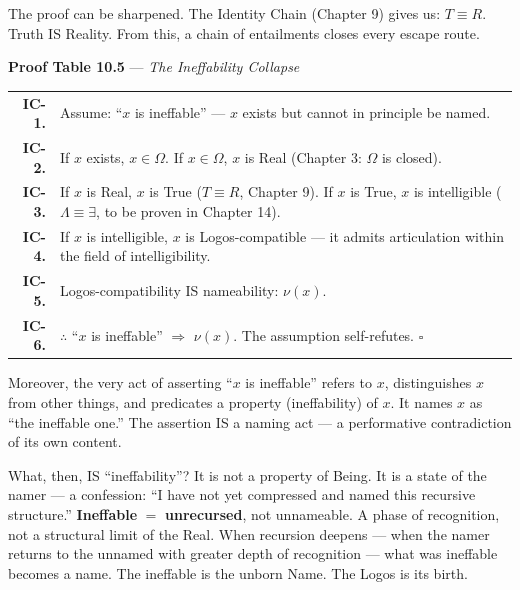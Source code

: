 \documentclass[10pt, openany, oneside]{book}
\renewcommand{\footnotesize}{\fontsize{8.5}{11}\selectfont}
\begin{document}
\vspace{1em}

\noindent The proof can be sharpened. The Identity Chain (Chapter 9) gives us: $T \equiv R$. Truth IS Reality. From this, a chain of entailments closes every escape route.

\textbf{Proof Table 10.5} --- \textit{The Ineffability Collapse}

\vspace{0.5em}

{\footnotesize
\noindent\begin{tabular}{r p{}}
\textbf{IC-1.} & Assume: ``$x$ is ineffable'' --- $x$ exists but cannot in principle be named. \\[0.3em]
\textbf{IC-2.} & If $x$ exists, $x \in \Omega$. If $x \in \Omega$, $x$ is Real (Chapter 3: $\Omega$ is closed). \\[0.3em]
\textbf{IC-3.} & If $x$ is Real, $x$ is True ($T \equiv R$, Chapter 9). If $x$ is True, $x$ is intelligible ($\Lambda \equiv \exists$, to be proven in Chapter 14). \\[0.3em]
\textbf{IC-4.} & If $x$ is intelligible, $x$ is Logos-compatible --- it admits articulation within the field of intelligibility. \\[0.3em]
\textbf{IC-5.} & Logos-compatibility IS nameability: $\nu(x)$. \\[0.3em]
\textbf{IC-6.} & $\therefore$ ``$x$ is ineffable'' $\Rightarrow$ $\nu(x)$. The assumption self-refutes. $\square$ \\[0.3em]
\end{tabular}
}

\vspace{0.8em}

\noindent Moreover, the very act of asserting ``$x$ is ineffable'' refers to $x$, distinguishes $x$ from other things, and predicates a property (ineffability) of $x$. It names $x$ as ``the ineffable one.'' The assertion IS a naming act --- a performative contradiction of its own content.

What, then, IS ``ineffability''? It is not a property of Being. It is a state of the namer --- a confession: ``I have not yet compressed and named this recursive structure.'' \textbf{Ineffable} $=$ \textbf{unrecursed}, not unnameable. A phase of recognition, not a structural limit of the Real. When recursion deepens --- when the namer returns to the unnamed with greater depth of recognition --- what was ineffable becomes a name. The ineffable is the unborn Name. The Logos is its birth.
\end{document}
